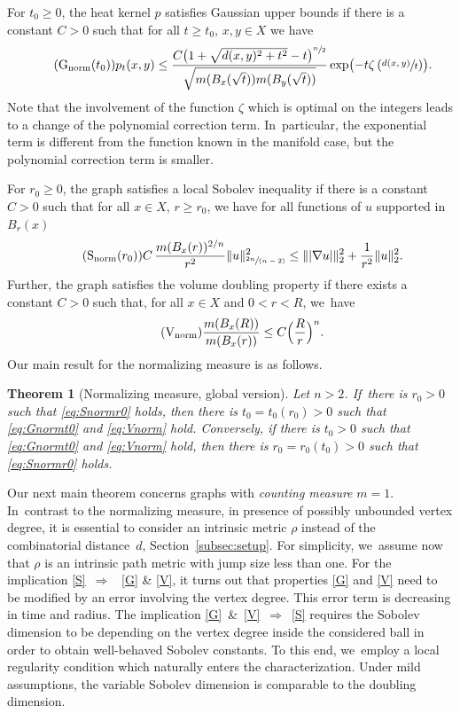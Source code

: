 \documentclass[10pt]{amsart}
\newcommand{\spfrac}[2]{\sfrac{#1}{(#2)}}
\newcommand{\norm}{\mathrm{norm}}
\newcommand{\rG}{\mathrm{G}}
\newcommand{\rS}{\mathrm{S}}
\newcommand{\rV}{\mathrm{V}}
\theoremstyle{plain}
\newtheorem{theorem}{Theorem}[section]
\theoremstyle{definition}
\begin{document}
For $t_0\geq 0$,
the heat kernel $p$ satisfies Gaussian upper bounds if there is a constant $C>0$ such that for all $t\geq t_0$, $x,y\in X$ we have
\begin{equation}\tag{$\rG_{\norm}(t_0)$}\label{eq:Gnormt0}
p_t(x,y)\leq \frac{C\bigl(1+\sqrt{{d}(x,y)^2+t^2}-t\bigr)^{\sfrac{n}{2}}}{\sqrt{m(B_x(\sqrt t))m(B_y(\sqrt t))}}\exp\bigl(-t\zeta\left(\sfrac{{d}(x,y)}{t}\right)\bigr).
\end{equation}
Note that the involvement of the function $\zeta$ which is optimal on the integers leads to a change of the polynomial correction term. In~particular, the exponential term is different from the function known in the manifold case, but the polynomial correction term is smaller.

For $r_0\geq 0$, the graph satisfies a local Sobolev inequality if there is a constant $C>0$ such that for all $x\in {X}$, $r\geq r_0$, we have for all functions of $u$ supported in~$B_r(x)$
\begin{equation}\tag{$\rS_{\norm}(r_0)$}\label{eq:Snormr0}
C\,\frac{m(B_x(r))^{2/n}}{r^2}\|u\|_{\spfrac{2n}{n-2}}^2\leq \||\nabla u|\|_2^2+\frac{1}{r^2}\|u\|_2^2.
\end{equation}
Further, the graph satisfies the volume doubling property if there exists a constant $C>0$ such that, for all $x\in X$ and $0<r<R$, we~have
\begin{equation}\tag{$\rV_{\norm}$}\label{eq:Vnorm}
\frac{m(B_x(R))}{m(B_x(r))}\leq C\Bigl(\frac{R}{r}\Bigr)^n.
\end{equation}
Our main result for the normalizing measure is as follows.
\begin{theorem}[Normalizing measure, global version]\label{thm:normalizedglobal}Let $n>2$. If~there is $r_0>0$ such that \eqref{eq:Snormr0} holds, then there is $t_0=t_0(r_0)>0$ such that \eqref{eq:Gnormt0} and \eqref{eq:Vnorm} hold. Conversely, if there is $t_0>0$ such that \eqref{eq:Gnormt0} and \eqref{eq:Vnorm} hold, then there is $r_0=r_0(t_0)>0$ such that \eqref{eq:Snormr0} holds.
\end{theorem}

Our next main theorem concerns graphs with {\it counting measure} $m=1$. In~contrast to the normalizing measure, in presence of possibly unbounded vertex degree, it is essential to consider an intrinsic metric $\rho$ instead of the combinatorial distance~$ d $, \cf Section~\ref{subsec:setup}. For simplicity, we~assume now that $\rho$ is an intrinsic path metric with jump size less than one. For the implication \eqref{S}~$\Rightarrow$~ \eqref{G} \& \eqref{V}, it turns out that properties \eqref{G} and \eqref{V} need to be modified by an error involving the vertex degree. This error term is decreasing in time and radius. The implication \eqref{G}\ \&\ \eqref{V}~$\Rightarrow$~\eqref{S} requires the Sobolev dimension to be depending on the vertex degree inside the considered ball in order to obtain well-behaved Sobolev constants. To this end, we~employ a local regularity condition which naturally enters the characterization. Under mild assumptions, the variable Sobolev dimension is comparable to the doubling dimension.
\end{document}
